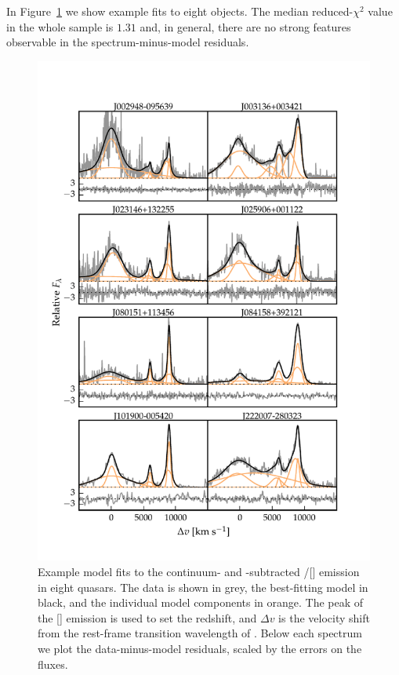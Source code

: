 In Figure~\ref{fig:example_spectrum_grid} we show example fits to eight objects. 
The median reduced-$\chi^2$ value in the whole sample is $1.31$ and, in general, there are no strong features observable in the spectrum-minus-model residuals.

\begin{figure}
    \centering
    \includegraphics[width=\textwidth]{figures/chapter04/example_spectrum_grid.pdf} 
    \caption[{Example model fits to the \hbns/[] emission in eight quasars.}]{Example model fits to the continuum- and -subtracted \hbns/[] emission in eight quasars. The data is shown in grey, the best-fitting model in black, and the individual model components in orange. The peak of the [] emission is used to set the redshift, and $\Delta{v}$ is the velocity shift from the rest-frame transition wavelength of \hbns. Below each spectrum we plot the data-minus-model residuals, scaled by the errors on the fluxes.}     
    \label{fig:example_spectrum_grid}
\end{figure}


